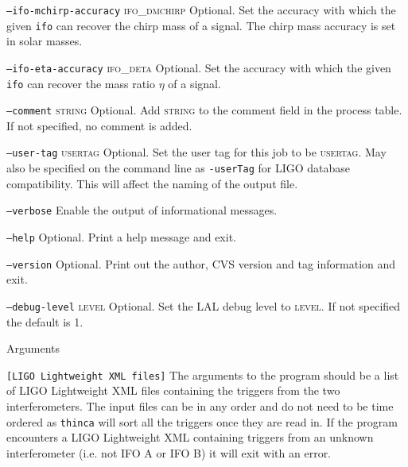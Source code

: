 \begin{entry}
\begin{entry}
\item[\texttt{--ifo-mchirp-accuracy} \textsc{ifo\_dmchirp}] Optional. Set the
accuracy with which the given \texttt{ifo} can recover the chirp mass of a
signal.  The chirp mass accuracy is set in solar masses.

\item[\texttt{--ifo-eta-accuracy} \textsc{ifo\_deta}] Optional. Set the
accuracy with which the given \texttt{ifo} can recover the mass ratio $\eta$
of a signal.

\item[\texttt{--comment} \textsc{string}] Optional. Add \textsc{string}
to the comment field in the process table. If not specified, no comment
is added. 

\item[\texttt{--user-tag} \textsc{usertag}] Optional. Set the user tag for
this job to be \textsc{usertag}. May also be specified on the command line as
\texttt{-userTag} for LIGO database compatibility.  This will affect the
naming of the output file.

\item[\texttt{--verbose}] Enable the output of informational messages.

\item[\texttt{--help}] Optional.  Print a help message and exit.

\item[\texttt{--version}] Optional.  Print out the author, CVS version and
tag information and exit.

\item[\texttt{--debug-level} \textsc{level}] Optional. Set the LAL debug
level to \textsc{level}. If not specified the default is 1.

\end{entry}

\item[Arguments]\leavevmode
\begin{entry}
\item[\texttt{[LIGO Lightweight XML files]}] The arguments to the program
should be a list of LIGO Lightweight XML files containing the triggers from
the two interferometers. The input files can be in any order and do not need
to be time ordered as \texttt{thinca} will sort all the triggers once they are
read in. If the program encounters a LIGO Lightweight XML containing triggers
from an unknown interferometer (i.e. not IFO A or IFO B) it will exit with an
error.
\end{entry}


\end{entry}
